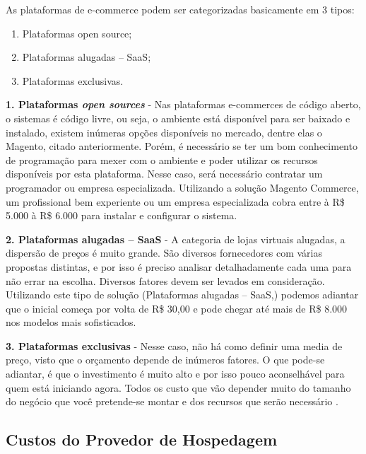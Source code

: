 As plataformas de e-commerce podem ser categorizadas basicamente em 3 tipos:

\begin{enumerate}
	\item Plataformas open source;
	\item Plataformas alugadas – SaaS;
	\item Plataformas exclusivas.
\end{enumerate}


\textbf{1. Plataformas \textit{open sources}} -  Nas plataformas e-commerces de código aberto, o sistemas é código livre, ou seja, o ambiente está disponível para ser baixado e instalado, existem inúmeras opções disponíveis no mercado, dentre elas o Magento, citado anteriormente. Porém, é necessário se ter um bom conhecimento de programação para mexer com o ambiente e poder utilizar os recursos disponíveis por esta plataforma. Nesse caso, será necessário contratar um programador ou empresa especializada. Utilizando a solução Magento Commerce, um profissional bem experiente ou um empresa especializada cobra entre à R\$ 5.000 à R\$ 6.000 para instalar e configurar o sistema.

\textbf{2. Plataformas alugadas – SaaS} - A categoria de lojas virtuais alugadas, a dispersão de preços é muito grande. São diversos fornecedores com várias propostas distintas, e por isso é preciso analisar detalhadamente cada uma para não errar na escolha. Diversos fatores devem ser levados em consideração. Utilizando este tipo de solução (Plataformas alugadas – SaaS,) podemos adiantar que o inicial começa por volta de R\$ 30,00 e pode chegar até mais de R\$ 8.000 nos modelos mais sofisticados.

\textbf{3. Plataformas exclusivas} - Nesse caso, não há como definir uma media de preço, visto que o orçamento depende de inúmeros fatores. O que pode-se adiantar, é que o investimento é muito alto e por isso pouco aconselhável para quem está iniciando agora. Todos os custo que vão depender muito do tamanho do negócio que você pretende-se montar e dos recursos que serão necessário \cite{Guiadeecommerce2014}.

\subsection{Custos do Provedor de Hospedagem}

